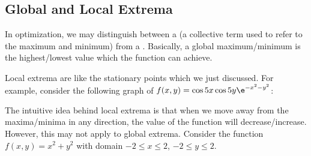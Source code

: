 \subsection{Global and Local Extrema}

In optimization, we may distinguish between a  (a collective term used to refer to the maximum and minimum) from a . Basically, a global maximum/minimum is the highest/lowest value which the function can achieve.

Local extrema are like the stationary points which we just discussed. For example, consider the following graph of $f(x, y) = \cos{5x} \cos{5y} \e^{-x^2 - y^2}$:

\begin{figure}[H]
    \centering
    \caption{}
\end{figure}

The intuitive idea behind local extrema is that when we move away from the maxima/minima in any direction, the value of the function will decrease/increase. However, this may not apply to global extrema. Consider the function $f(x, y) = x^2 + y^2$ with domain $-2 \leq x \leq 2$, $-2\leq y \leq 2$.

\begin{figure}[H]
    \centering
    \caption{}
\end{figure}

